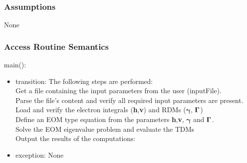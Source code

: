 \documentclass[12pt, titlepage]{article}
\begin{document}
\subsubsection{Assumptions}

None

\subsubsection{Access Routine Semantics}

\noindent main():
\begin{itemize}
\item transition: The following steps are performed:\\
Get a file containing the input parameters from the user (inputFile).\\
\newline Parse the file's content and verify all required input parameters are 
present.\\
\newline Load and verify the electron integrals (\textbf{h},\textbf{v}) and 
RDMs ($\boldsymbol{\gamma}$, $\bold{\Gamma}$)\\
\newline Define an EOM type equation from the parameters \textbf{h},\textbf{v}, 
$\boldsymbol{\gamma}$ and $\bold{\Gamma}$.\\
\newline Solve the EOM eigenvalue problem and evaluate the TDMs\\
\newline Output the results of the computations:\\
\item exception: None
\end{itemize}
\end{document}
